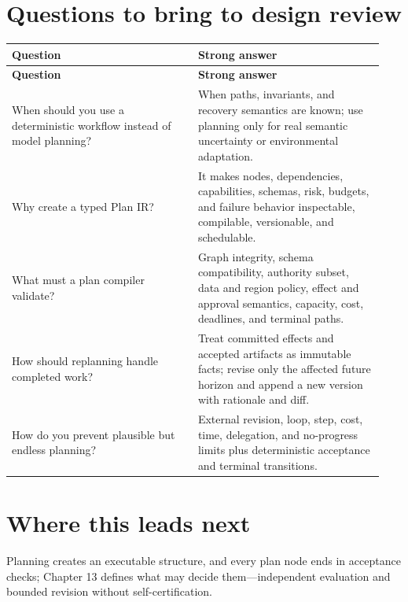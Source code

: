 \section{Questions to bring to design review}

\BookTableStart
\small
\begin{longtable}{@{}Y{0.4700\linewidth}Y{0.4700\linewidth}@{}}
\color{white}\bfseries \textbf{Question} & \color{white}\bfseries \textbf{Strong answer} \\
\endfirsthead
{}
\color{white}\bfseries \textbf{Question} & \color{white}\bfseries \textbf{Strong answer} \\
\endhead
When should you use a deterministic workflow instead of model planning? & When paths, invariants, and recovery semantics are known; use planning only for real semantic uncertainty or environmental adaptation. \\
Why create a typed Plan IR? & It makes nodes, dependencies, capabilities, schemas, risk, budgets, and failure behavior inspectable, compilable, versionable, and schedulable. \\
What must a plan compiler validate? & Graph integrity, schema compatibility, authority subset, data and region policy, effect and approval semantics, capacity, cost, deadlines, and terminal paths. \\
How should replanning handle completed work? & Treat committed effects and accepted artifacts as immutable facts; revise only the affected future horizon and append a new version with rationale and diff. \\
How do you prevent plausible but endless planning? & External revision, loop, step, cost, time, delegation, and no-progress limits plus deterministic acceptance and terminal transitions. \\
\end{longtable}
\BookTableEnd

\section{Where this leads next}

Planning creates an executable structure, and every plan node ends in acceptance checks; Chapter 13 defines what may decide them—independent evaluation and bounded revision without self-certification.\par


